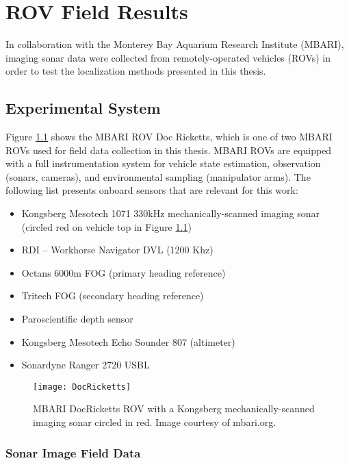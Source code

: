 
\chapter{ROV Field Results}
\label{ch.ROV}

In collaboration with the Monterey Bay Aquarium Research Institute (MBARI), imaging sonar data were collected from remotely-operated vehicles (ROVs) in order to test the localization methods presented in this thesis.

\section{Experimental System}
\label{rov.Experimental}

Figure \ref{fig:DocRicketts} shows the MBARI ROV Doc Ricketts, which is one of two MBARI ROVs used for field data collection in this thesis.
MBARI ROVs are equipped with a full instrumentation system for vehicle state estimation, observation (sonars, cameras), and environmental sampling (manipulator arms).
The following list presents onboard sensors that are relevant for this work:

\begin{itemize}
\item Kongsberg Mesotech 1071 330kHz mechanically-scanned imaging sonar (circled red on vehicle top in Figure \ref{fig:DocRicketts})
\item RDI – Workhorse Navigator DVL (1200 Khz)
\item Octans 6000m FOG (primary heading reference)
\item Tritech FOG (secondary heading reference)
\item Paroscientific depth sensor
\item Kongsberg Mesotech Echo Sounder 807 (altimeter)
\item Sonardyne Ranger 2720 USBL
\end{itemize}

\begin{figure}[!h]
	\centering
		\texttt{[image: DocRicketts]}
	\caption{MBARI DocRicketts ROV with a Kongsberg mechanically-scanned imaging sonar circled in red.  Image courtesy of mbari.org.}
	\label{fig:DocRicketts}
\end{figure}

\subsection{Sonar Image Field Data}
\label{rov.Experimental.Sonar}

